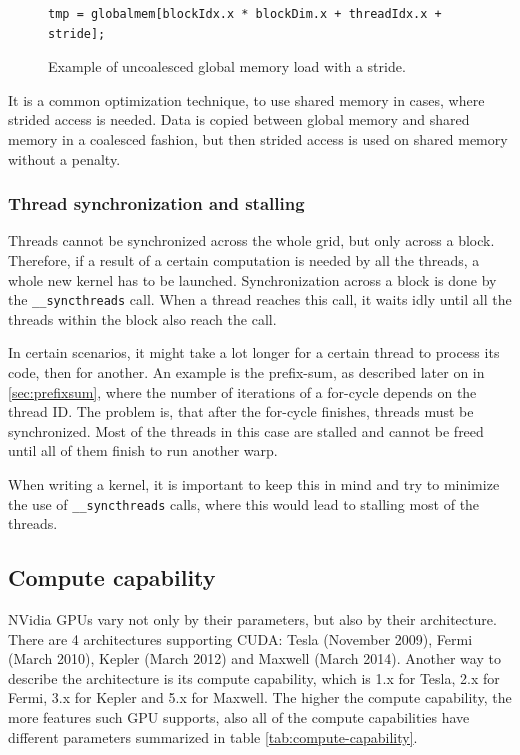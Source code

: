 \begin{figure}[h]
\begin{verbatim}
tmp = globalmem[blockIdx.x * blockDim.x + threadIdx.x + stride];
\end{verbatim}
\caption{Example of uncoalesced global memory load with a stride.}\label{code:uncoalesced}
\end{figure}

It is a common optimization technique, to use shared memory in cases, where strided access is needed. Data is copied between global memory and shared memory in a coalesced fashion, but then strided access is used on shared memory without a penalty.

\subsubsection{Thread synchronization and stalling}\label{subsubsec:cuda-thread-sync-stall}

Threads cannot be synchronized across the whole grid, but only across a block. Therefore, if a result of a certain computation is needed by all the threads, a whole new kernel has to be launched. Synchronization across a block is done by the \verb|__syncthreads| call. When a thread reaches this call, it waits idly until all the threads within the block also reach the call.

In certain scenarios, it might take a lot longer for a certain thread to process its code, then for another. An example is the prefix-sum, as described later on in \ref{sec:prefixsum}, where the number of iterations of a for-cycle depends on the thread ID. The problem is, that after the for-cycle finishes, threads must be synchronized. Most of the threads in this case are stalled and cannot be freed until all of them finish to run another warp.

When writing a kernel, it is important to keep this in mind and try to minimize the use of \verb|__syncthreads| calls, where this would lead to stalling most of the threads.

\FloatBarrier

\subsection{Compute capability}\label{subsec:cuda-compute-capability}

NVidia GPUs vary not only by their parameters, but also by their architecture. There are 4 architectures supporting CUDA: Tesla (November 2009), Fermi (March 2010), Kepler (March 2012) and Maxwell (March 2014). Another way to describe the architecture is its compute capability, which is 1.x for Tesla, 2.x for Fermi, 3.x for Kepler and 5.x for Maxwell. The higher the compute capability, the more features such GPU supports, also all of the compute capabilities have different parameters summarized in table \ref{tab:compute-capability}.


